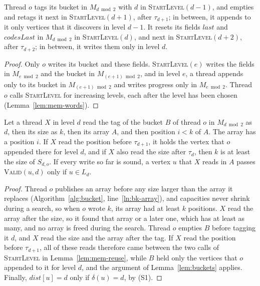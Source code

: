 \begin{lemma}[Reuse]
\label{lem:mem-reuse}
Thread $o$ tags its bucket in $M_{d \bmod 2}$ with $d$ in \textsc{StartLevel}$(d-1)$, and empties and retags it next in \textsc{StartLevel}$(d+1)$, after $\tau_{d+1}$; in between, it appends to it only vertices that it discovers in level $d-1$. It resets its fields $\mathit{last}$ and $\mathit{codesLast}$ in $M_{d \bmod 2}$ in \textsc{StartLevel}$(d)$, and next in \textsc{StartLevel}$(d+2)$, after $\tau_{d+2}$; in between, it writes them only in level $d$.
\end{lemma}
\begin{proof}
Only $o$ writes its bucket and these fields. \textsc{StartLevel}$(e)$ writes the fields in $M_{e \bmod 2}$ and the bucket in $M_{(e+1) \bmod 2}$, and in level $e$, a thread appends only to its bucket in $M_{(e+1) \bmod 2}$ and writes progress only in $M_{e \bmod 2}$. Thread $o$ calls \textsc{StartLevel} for increasing levels, each after the level has been chosen (Lemma~\ref{lem:mem-words}).
\end{proof}

\begin{lemma}
\label{lem:mem-reads}
Let a thread $X$ in level $d$ read the tag of the bucket $B$ of thread $o$ in $M_{d \bmod 2}$ as $d$, then its size as $k$, then its array $A$, and then position $i < k$ of $A$. The array has a position $i$. If $X$ read the position before $\tau_{d+1}$, it holds the vertex that $o$ appended there for level $d$, and if $X$ also read the size after $\tau_d$, then $k$ is at least the size of $S_{d,o}$. If every write so far is sound, a vertex $u$ that $X$ reads in $A$ passes \textsc{Valid}$(u, d)$ only if $u \in L_d$.
\end{lemma}
\begin{proof}
Thread $o$ publishes an array before any size larger than the array it replaces (Algorithm~\ref{alg:bucket}, line~\ref{ln:bk-array}), and capacities never shrink during a search, so when $o$ wrote $k$, its array had at least $k$ positions. $X$ read the array after the size, so it found that array or a later one, which has at least as many, and no array is freed during the search. Thread $o$ empties $B$ before tagging it $d$, and $X$ read the size and the array after the tag. If $X$ read the position before $\tau_{d+1}$, all of these reads therefore came between the two calls of \textsc{StartLevel} in Lemma~\ref{lem:mem-reuse}, while $B$ held only the vertices that $o$ appended to it for level $d$, and the argument of Lemma~\ref{lem:buckets} applies. Finally, $\mathit{dist}[u] = d$ only if $\delta(u) = d$, by (S1).
\end{proof}

